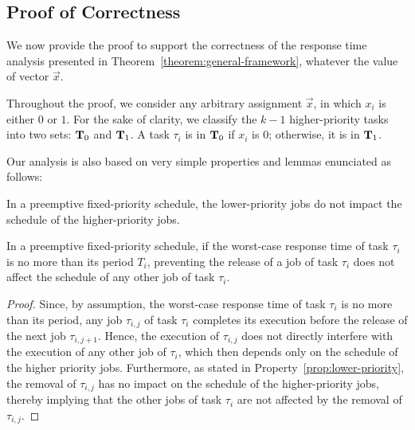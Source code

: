 \subsection{Proof of Correctness}  
\label{sec:proof-th1}

We now provide the proof to support the correctness of the response time analysis presented in
Theorem~\ref{theorem:general-framework}, whatever the value of vector $\vec{x}$.  %

Throughout the proof, we consider any arbitrary assignment
$\vec{x}$, in which $x_i$ is either $0$ or $1$. For the sake of clarity, we classify the $k-1$
higher-priority tasks into two sets: ${\bf T}_0$ and ${\bf T}_1$. A
task $\tau_i$ is in ${\bf T}_0$ if $x_i$ is $0$; otherwise, it is in
${\bf T}_1$.




Our analysis is also based on very simple properties and lemmas enunciated as follows:

\begin{Property}
\label{prop:lower-priority}
In a preemptive fixed-priority schedule, the lower-priority jobs do not impact the schedule of the higher-priority jobs.
\end{Property}


\begin{Lemma}
\label{lemma:remove-same-task}
In a preemptive fixed-priority schedule, if the worst-case response time of task $\tau_i$ is no more than its period $T_i$, preventing the release of a job of task $\tau_i$ does not affect the schedule of any other job of task $\tau_i$.
\end{Lemma}
\begin{proof}
Since, by assumption, the worst-case response time of task $\tau_i$ is no more than its period, any job $\tau_{i,j}$ of task $\tau_i$ completes its execution before the release of the next job $\tau_{i,j+1}$. Hence, the execution of $\tau_{i,j}$ does not directly interfere with the execution of any other job of $\tau_i$, which then depends only on the schedule of the higher priority jobs. Furthermore, as stated in Property~\ref{prop:lower-priority}, the removal of $\tau_{i,j}$ has no impact on the schedule of the higher-priority jobs, thereby implying that the other jobs of task $\tau_i$ are not affected by the removal of $\tau_{i,j}$.
\end{proof}


